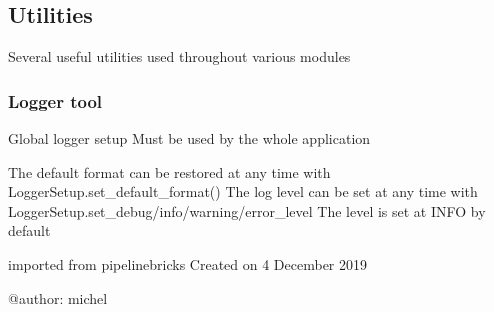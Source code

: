 \documentclass[letterpaper,10pt,english]{sphinxmanual}
\begin{document}
\subsection{Utilities}
\label{\detokenize{APIdocs/utilities:utilities}}\label{\detokenize{APIdocs/utilities::doc}}
\sphinxAtStartPar
Several useful utilities used throughout various modules


\subsubsection{Logger tool}
\label{\detokenize{APIdocs/utilities:module-ixpetools.utils.logger}}\label{\detokenize{APIdocs/utilities:logger-tool}}
\sphinxAtStartPar
Global logger setup
Must be used by the whole application

\sphinxAtStartPar
The default format can be restored at any time with LoggerSetup.set\_default\_format()
The log level can be set at any time with LoggerSetup.set\_debug/info/warning/error\_level
The level is set at INFO by default

\sphinxAtStartPar
imported from pipeline\sphinxhyphen{}bricks
Created on 4 December 2019

\sphinxAtStartPar
@author: michel
\end{document}
